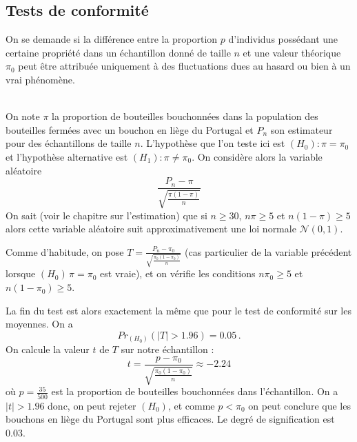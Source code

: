 \documentclass[12pt, a4paper]{book}
\numberwithin{equation}{section}
\begin{document}
\subsection{Tests de conformité}

On se demande si la différence entre la proportion $p$ d'individus possédant une certaine propriété 
 dans un échantillon donné de taille $n$ et une valeur théorique $\pi_0$ peut être attribuée 
 uniquement à des fluctuations dues au hasard ou bien à un vrai phénomène. 
 
\\


On note $\pi$ la proportion de bouteilles bouchonnées dans la population des bouteilles fermées avec un 
bouchon en liège du Portugal et $P_n$ son estimateur pour des échantillons de taille $n$.
L'hypothèse que l'on teste ici est $(H_0) : \pi=\pi_0$ et l'hypothèse alternative est 
$(H_1) : \pi \neq \pi_0$. 
On considère alors la variable aléatoire 
$$
\frac{ P_n-\pi}{\sqrt{\frac{\pi(1-\pi)}{n}}}
$$
On sait (voir le chapitre sur l'estimation) que si $n\geq 30$, $n\pi\geq 5$ et $n(1-\pi)\geq 5$ alors cette 
variable aléatoire suit approximativement une loi normale $\mathcal{N}(0,1)$.

Comme d'habitude, on pose
$\displaystyle T=\frac{ P_n-\pi_0}{\sqrt{\frac{\pi_0(1-\pi_0)}{n}}}$ 
(cas particulier de la variable précédent lorsque $(H_0)\, \pi=\pi_0$ est vraie), 
et on vérifie les conditions $n\pi_0\geq 5$ et $n(1-\pi_0)\geq 5$. 

La fin du test est alors exactement la même que pour le test de conformité sur les moyennes.
On a 
$$
Pr_{(H_0)}(|T|>1.96) = 0.05\,.
$$
On calcule la valeur $t$ de $T$ sur notre échantillon :
$$
t=\frac{p-\pi_0}{\sqrt{\frac{\pi_0(1-\pi_0)}{n}}} \approx -2.24
$$
où $p=\frac{35}{500}$ est la proportion de bouteilles bouchonnées dans l'échantillon.
On a $|t|>1.96$ donc, on peut rejeter $(H_0)$, et comme $p<\pi_0$ on peut conclure que les bouchons en liège 
du Portugal sont plus efficaces. Le degré de signification est 0.03.
\end{document}
